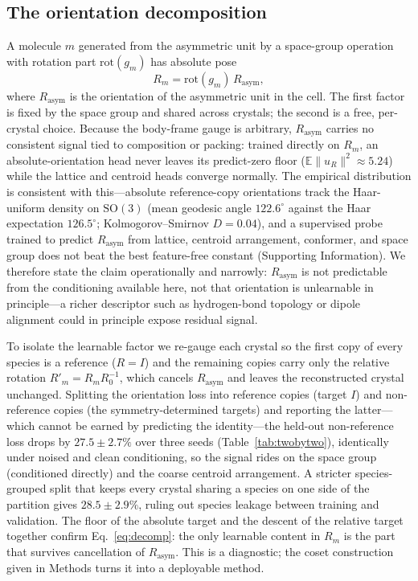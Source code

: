 \documentclass[journal=acsodf,manuscript=article]{achemso}
\begin{document}
\subsection{The orientation decomposition}\label{sec:decomp}
A molecule $m$ generated from the asymmetric unit by a space-group operation with
rotation part $\mathrm{rot}(g_m)$ has absolute pose
\begin{equation}
R_m = \mathrm{rot}(g_m)\,R_{\text{asym}},
\label{eq:decomp}
\end{equation}
where $R_{\text{asym}}$ is the orientation of the asymmetric unit in the cell. The
first factor is fixed by the space group and shared across crystals; the second is
a free, per-crystal choice. Because the body-frame gauge is arbitrary,
$R_{\text{asym}}$ carries no consistent signal tied to composition or packing:
trained directly on $R_m$, an absolute-orientation head never leaves its
predict-zero floor ($\mathbb{E}\lVert u_R\rVert^2\!\approx\!5.24$) while the
lattice and centroid heads converge normally. The empirical distribution is
consistent with this---absolute reference-copy orientations track the Haar-uniform
density on $\mathrm{SO}(3)$ (mean geodesic angle $122.6^\circ$ against the Haar
expectation $126.5^\circ$; Kolmogorov--Smirnov $D=0.04$), and a supervised probe
trained to predict $R_{\text{asym}}$ from lattice, centroid arrangement, conformer,
and space group does not beat the best feature-free constant (Supporting
Information). We therefore state the claim operationally and narrowly:
$R_{\text{asym}}$ is not predictable from the conditioning available here, not that
orientation is unlearnable in principle---a richer descriptor such as
hydrogen-bond topology or dipole alignment could in principle expose residual
signal.

To isolate the learnable factor we re-gauge each crystal so the first copy of every
species is a reference ($R=I$) and the remaining copies carry only the relative
rotation $R'_m=R_mR_0^{-1}$, which cancels $R_{\text{asym}}$ and leaves the
reconstructed crystal unchanged. Splitting the orientation loss into reference
copies (target $I$) and non-reference copies (the symmetry-determined targets) and
reporting the latter---which cannot be earned by predicting the identity---the
held-out non-reference loss drops by $27.5\pm2.7\%$ over three seeds
(Table~\ref{tab:twobytwo}), identically under noised and clean conditioning, so the
signal rides on the space group (conditioned directly) and the coarse centroid
arrangement. A stricter species-grouped split that keeps every crystal sharing a
species on one side of the partition gives $28.5\pm2.9\%$, ruling out species
leakage between training and validation. The floor of the absolute target and the
descent of the relative target together confirm Eq.~\eqref{eq:decomp}: the only
learnable content in $R_m$ is the part that survives cancellation of
$R_{\text{asym}}$. This is a diagnostic; the coset construction given in Methods
turns it into a deployable method.
\end{document}
